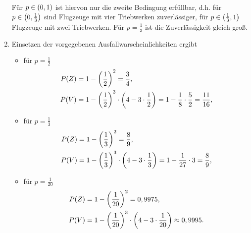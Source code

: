 \documentclass{exercise}
\begin{document}
\begin{enumerate}
\begin{align*}
        \end{align*}
        Für \(p \in \parentheses*{0, 1}\) ist hiervon nur die zweite Bedingung erfüllbar, d.h. für \(p \in \parentheses*{0, \frac{1}{3}}\) sind Flugzeuge mit vier Triebwerken zuverlässiger, für \(p \in \parentheses*{\frac{1}{3}, 1}\) Flugzeuge mit zwei Triebwerken.
        Für \(p = \frac{1}{3}\) ist die Zuverlässigkeit gleich groß.
        \item Einsetzen der vorgegebenen Ausfallwarscheinlichkeiten ergibt
        \begin{itemize}
            \item für \(p = \frac{1}{2}\)
            \begin{align*}
                P\parentheses*{Z} &= 1 - \parentheses*{\frac{1}{2}}^2 = \frac{3}{4},\\
                P\parentheses*{V} &= 1 - \parentheses*{\frac{1}{2}}^3 \cdot \parentheses*{4 - 3 \cdot \frac{1}{2}} = 1 - \frac{1}{8} \cdot \frac{5}{2} = \frac{11}{16},
            \end{align*}
            \item für \(p = \frac{1}{3}\)
            \begin{align*}
                P\parentheses*{Z} &= 1 - \parentheses*{\frac{1}{3}}^2 = \frac{8}{9},\\
                P\parentheses*{V} &= 1 - \parentheses*{\frac{1}{3}}^3 \cdot \parentheses*{4 - 3 \cdot \frac{1}{3}} = 1 - \frac{1}{27} \cdot 3 = \frac{8}{9},
            \end{align*}
            \item für \(p = \frac{1}{20}\)
            \begin{align*}
                P\parentheses*{Z} &= 1 - \parentheses*{\frac{1}{20}}^2 = 0,9975,\\
                P\parentheses*{V} &= 1 - \parentheses*{\frac{1}{20}}^3 \cdot \parentheses*{4 - 3 \cdot \frac{1}{20}} \approx 0,9995.
            \end{align*}
        \end{itemize}
    \end{enumerate}
\end{document}
